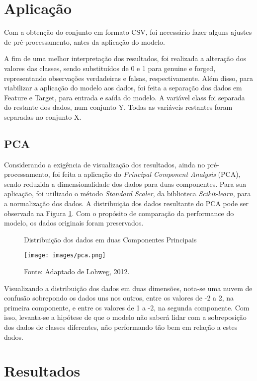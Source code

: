 \documentclass[12pt]{article}
\begin{document}
\section{Aplicação}

Com a obtenção do conjunto em formato CSV, foi necessário fazer alguns ajustes de pré-processamento, antes da aplicação do modelo.

A fim de uma melhor interpretação dos resultados, foi realizada a alteração dos valores das classes, sendo substituídos de 0 e 1 para genuine e forged, representando observações verdadeiras e falsas, respectivamente. Além disso, para viabilizar a aplicação do modelo aos dados, foi feita a separação dos dados em Feature e Target, para entrada e saída do modelo. A variável class foi separada do restante dos dados, num conjunto Y. Todas as variáveis restantes foram separadas no conjunto X.

\subsection{PCA}

Considerando a exigência de visualização dos resultados, ainda no pré-processamento, foi feita a aplicação do \textit{Principal Component Analysis} (PCA), sendo reduzida a dimensionalidade dos dados para duas componentes. Para sua aplicação, foi utilizado o método \textit{Standard Scaler}, da biblioteca \textit{Scikit-learn}, para a normalização dos dados. A distribuição dos dados resultante do PCA pode ser observada na Figura \ref{fig:pca}. Com o propósito de comparação da performance do modelo, os dados originais foram preservados.

\begin{figure}[H]
    \centering
    \caption{\fontsize{10}{12}\selectfont Distribuição dos dados em duas Componentes Principais}
    \texttt{[image: images/pca.png]}
    \caption*{\fontsize{10}{12}\selectfont Fonte:  Adaptado de Lohweg, 2012.}
    \label{fig:pca}
\end{figure}

Visualizando a distribuição dos dados em duas dimensões, nota-se uma nuvem de confusão sobrepondo os dados uns nos outros, entre os valores de -2 a 2, na primeira componente, e entre os valores de 1 a -2, na segunda componente. Com isso, levanta-se a hipótese de que o modelo não saberá lidar com a sobreposição dos dados de classes diferentes, não performando tão bem em relação a estes dados.

\section{Resultados}
\end{document}
